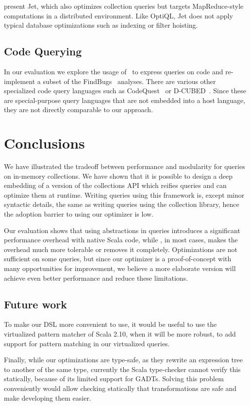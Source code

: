 \citet{Ackermann12} present Jet, which also optimizes collection queries but
targets MapReduce-style computations in a distributed environment.
Like OptiQL, Jet does not apply typical database optimizations such as
indexing or filter hoisting.

\section{Code Querying}
In our evaluation we explore the usage of \LoS\ to express queries on code and re-implement a subset of the FindBugs~\citep{DBLP:journals/sigplan/HovemeyerP04} analyses. There are various other specialized code query languages such as 
CodeQuest~\citep{Hajiyev06CodeQuest} or D-CUBED~\citep{Wegrzynowicz:2009:GBU:1639950.1640032}. 
Since these are special-purpose query languages that are not embedded into a host language, they are not directly comparable to our approach.



\chapter{Conclusions}
\label{ch:aosd13-concl}

We have illustrated the tradeoff between performance and modularity for queries on in-memory collections. We have shown that it is possible to design a deep embedding of a version of the collections API which reifies queries and can optimize them at runtime.
Writing queries using this framework is, except minor syntactic details, the same as writing queries using the collection library, hence the adoption barrier to using our optimizer is low. 

Our evaluation shows that using abstractions in queries introduces a significant
performance overhead with native Scala code, while \LoS{}, in most cases, makes
the overhead much more tolerable or removes it completely. Optimizations are not
sufficient on some queries, but since our optimizer is a proof-of-concept with
many opportunities for improvement, we believe a more elaborate version will
achieve even better performance and reduce these limitations.

\section{Future work}

To make our DSL more convenient to use, it would be useful to use the
virtualized pattern matcher of Scala 2.10, when it will be more robust, to add
support for pattern matching in our virtualized queries.

Finally, while our optimizations are type-safe, as they rewrite an expression
tree to another of the same type, currently the Scala
type-checker cannot verify this statically, because of its limited support for
GADTs.
Solving this problem conveniently would allow checking statically that
transformations are safe and make developing them easier.
